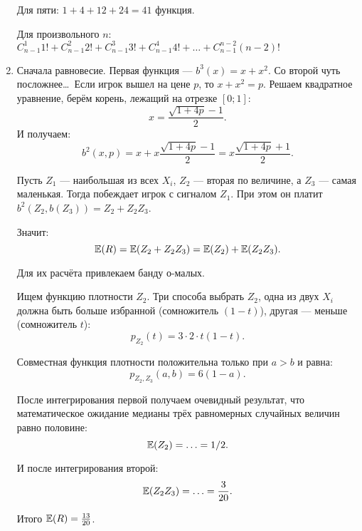 \begin{enumerate}
Для пяти: $1+4+12+24=41$ функция.

Для произвольного $ n $: $ C_{n-1}^{1}1!+C_{n-1}^{2}2!+C_{n-1}^{3}3!+C_{n-1}^{4}4!+\ldots +C_{n-1}^{n-2}(n-2)! $


\item Сначала равновесие. Первая функция — $ b^{3}(x)=x+x^{2} $. Со второй чуть посложнее\ldots~Если игрок вышел на цене $ p $, то $ x+x^{2}=p $. Решаем квадратное уравнение, берём корень, лежащий на отрезке $ [0;1] $:
\begin{equation}
x=\frac{\sqrt{1+4p}-1}{2}.
\end{equation}
И получаем:
\begin{equation}
b^{2}(x,p)=x+x\frac{\sqrt{1+4p}-1}{2}=x\frac{\sqrt{1+4p}+1}{2}.
\end{equation}

Пусть $ Z_{1} $ — наибольшая из всех $ X_{i} $, $ Z_{2} $ — вторая по величине, а $ Z_{3} $ — самая маленькая. Тогда побеждает игрок с сигналом $ Z_{1} $. При этом он платит $ b^{2}(Z_{2},b(Z_{3}))=Z_{2}+Z_{2}Z_{3} $.

Значит:
\begin{equation}
\operatorname{\mathbb{E}}(R)=\operatorname{\mathbb{E}}(Z_{2}+Z_{2}Z_{3})=\operatorname{\mathbb{E}}(Z_{2})+\operatorname{\mathbb{E}}(Z_{2}Z_{3}).
\end{equation}

Для их расчёта привлекаем банду о-малых.


Ищем функцию плотности $ Z_{2} $. Три способа выбрать $ Z_{2} $, одна из двух $ X_{i} $ должна быть больше избранной (сомножитель $ (1-t) $), другая — меньше (сомножитель $ t $):
\begin{equation}
p_{Z_{2}}(t)=3\cdot 2\cdot t(1-t).
\end{equation}

Совместная функция плотности положительна только при $ a>b $ и равна:
\begin{equation}
p_{Z_{2},Z_{3}}(a,b)=6(1-a).
\end{equation}

После интегрирования первой получаем очевидный результат, что математическое ожидание медианы трёх равномерных случайных величин равно половине:
\begin{equation}
\operatorname{\mathbb{E}}(Z_{2})=\ldots=1/2.
\end{equation}

И после интегрирования второй:
\begin{equation}
\operatorname{\mathbb{E}}(Z_{2}Z_{3})=\ldots=\frac{3}{20}.
\end{equation}

Итого $ \operatorname{\mathbb{E}}(R)=\frac{13}{20} $.


\end{enumerate}
